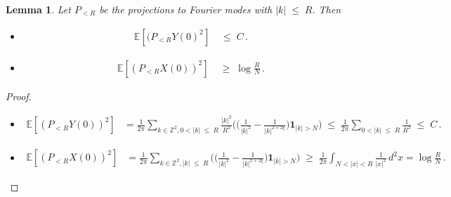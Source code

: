 \documentclass[11pt]{article}
\numberwithin{equation}{section}
\newtheorem{lemma}[theorem]{Lemma}
\theoremstyle{definition}
\renewcommand{\leq}{\;\leqslant\;}                   %
\renewcommand{\geq}{\;\geqslant\;}                   %
\newcommand{\Z}{\mathbb{Z}}
\newcommand{\E}{\mathbb{E}}
\newcommand{\ab}{|}
\newcommand{\PR}{ {P_{< R}}}
\begin{document}
  \begin{lemma}\label{lem:mu_nu_bounds}
  Let $\PR$ be the projections to Fourier modes with  $\ab k \ab \leq R$. Then 
  \begin{itemize}
  \item[(i)] 
  \begin{align*}
  \E[( \PR Y(0)^2] &\leq C\,.
  \end{align*}
  \item[(ii)]
  \begin{align*}
  \E[ ( \PR X(0))^2 ] & \geq \log \tfrac R N\,.
  \end{align*}
  \end{itemize}
  \end{lemma}
  \begin{proof} \begin{itemize} \item[(i)]
  \begin{align*}
   \mathbb{E}[( \PR Y(0))^2] &= \tfrac{1}{2\pi} \sum_{k \in \Z^2, 0<|k|\leq R} \tfrac{|k|^2}{R^2} \Big(  \big( \tfrac{1}{|k|^2} - \tfrac{1}{|k|^{2+2\xi}} \big) \mathbf{1}_{|k| >N}  \Big)  \leq \tfrac{1}{2\pi} \sum_{0<|k| \leq R}  \tfrac{1}{R^2}  \leq C \,.
   \end{align*}
   \item[(ii)]
   \begin{align*}
   \E[(\PR X(0))^2] &= \tfrac{1}{2\pi} \sum_{k \in \Z^2, |k| \leq R} \Big(  \big( \tfrac{1}{|k|^2} - \tfrac{1}{|k|^{2+2\xi}} \big) \mathbf{1}_{|k| > N}  \Big)  \geq \tfrac{1}{2\pi} \int_{N<|x|<R} \tfrac{1}{|x|^2} \, d^2x = \log \tfrac{R}{N} \,.
   \end{align*}
  \end{itemize}
  
  \end{proof}
  
\end{document}
